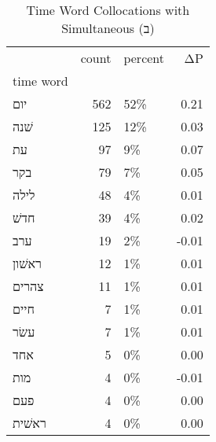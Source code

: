 \begin{table}[htbp!]
\centering
\caption{Time Word Collocations with Simultaneous (ב)}
\label{table:simב_head_cpd}
\begin{tabular}{lrlr}
\toprule
{} &  count & percent &    ΔP \\
time word &        &         &       \\
\midrule
יום       &    562 &     52\% &  0.21 \\
שׁנה      &    125 &     12\% &  0.03 \\
עת        &     97 &      9\% &  0.07 \\
בקר       &     79 &      7\% &  0.05 \\
לילה      &     48 &      4\% &  0.01 \\
חדשׁ      &     39 &      4\% &  0.02 \\
ערב       &     19 &      2\% & -0.01 \\
ראשׁון    &     12 &      1\% &  0.01 \\
צהרים     &     11 &      1\% &  0.01 \\
חיים      &      7 &      1\% &  0.01 \\
עשׂר      &      7 &      1\% &  0.01 \\
אחד       &      5 &      0\% &  0.00 \\
מות       &      4 &      0\% & -0.01 \\
פעם       &      4 &      0\% &  0.00 \\
ראשׁית    &      4 &      0\% &  0.00 \\
\bottomrule
\end{tabular}
\end{table}
